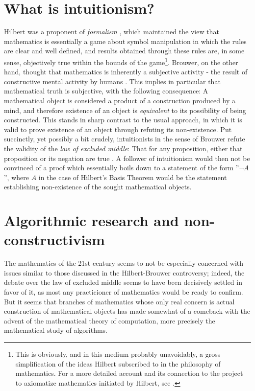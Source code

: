 \section{What is intuitionism?}
Hilbert was a proponent of \emph{formalism} \cite{zachHilbertProgram2019}, which maintained the view that mathematics is essentially a game about symbol manipulation in which the rules are clear and well defined, and results obtained through these rules are, in some sense, objectively true within the bounds of the game\footnote{This is obviously, and in this medium probably unavoidably, a gross simplification of the ideas Hilbert subscribed to in the philosophy of mathematics. For a more detailed account and its connection to the project to axiomatize mathematics initiated by Hilbert, see \cite{zachHilbertProgram2019}.}. Brouwer, on the other hand, thought that mathematics is inherently a subjective activity - the result of constructive mental activity by humans \cite{iemhoffIntuitionismPhilosophyMathematics2020}. This implies in particular that mathematical truth is subjective, with the following consequence: A mathematical object is considered a product of a construction produced by a mind, and therefore existence of an object is \emph{equivalent} to its possibility of being constructed. This stands in sharp contrast to the usual approach, in which it is valid to prove existence of an object through refuting its non-existence. Put succinctly, yet possibly a bit crudely, intuitionists in the sense of Brouwer refute the validity of the \emph{law of excluded middle}: That for any proposition, either that proposition or its negation are true \cite{iemhoffIntuitionismPhilosophyMathematics2020}. A follower of intuitionism would then not be convinced of a proof which essentially boils down to a statement of the form ''$\lnot A$'', where $A$ in the case of Hilbert's Basis Theorem would be the statement establishing non-existence of the sought mathematical objects.

\section{Algorithmic research and non-constructivism}
The mathematics of the 21st century seems to not be especially concerned with issues similar to those discussed in the Hilbert-Brouwer controversy; indeed, the debate over the law of excluded middle seems to have been decisively settled in favor of it, as most any practicioner of mathematics would be ready to confirm. But it seems that branches of mathematics whose only real concern is actual construction of mathematical objects has made somewhat of a comeback with the advent of the mathematical theory of computation, more precisely the mathematical study of algorithms.

